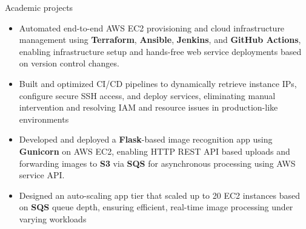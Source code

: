 \documentclass{resume}
\begin{document}
\begin{experienceSection}{Academic projects}

    \projectItem[
        title={End-to-End Deployment Automation},
        duration={Apr 2025},
    ]
    \begin{itemize}
        \vspace{-0.5em}
        \itemsep -6pt {}
        \item Automated end-to-end AWS EC2 provisioning and cloud infrastructure management using \textbf{Terraform}, \textbf{Ansible}, \textbf{Jenkins}, and \textbf{GitHub Actions}, enabling infrastructure setup and hands-free web service deployments based on version control changes.
        \item Built and optimized CI/CD pipelines to dynamically retrieve instance IPs, configure secure SSH access, and deploy services, eliminating manual intervention and resolving IAM and resource issues in production-like environments
    \end{itemize}

    \projectItem[
        title=AWS-Based Face Recognition App,
        duration={May 2024},
    ]
    \begin{itemize}
        \vspace{-0.5em}
        \itemsep -6pt {}
        \item Developed and deployed a \textbf{Flask}-based image recognition app using \textbf{Gunicorn} on AWS EC2, enabling HTTP REST API based uploads and forwarding images to \textbf{S3} via \textbf{SQS} for asynchronous processing using AWS service API.
        \item Designed an auto-scaling app tier that scaled up to 20 EC2 instances based on \textbf{SQS} queue depth, ensuring efficient, real-time image processing under varying workloads
    \end{itemize}
    
\end{experienceSection}
\end{document}
